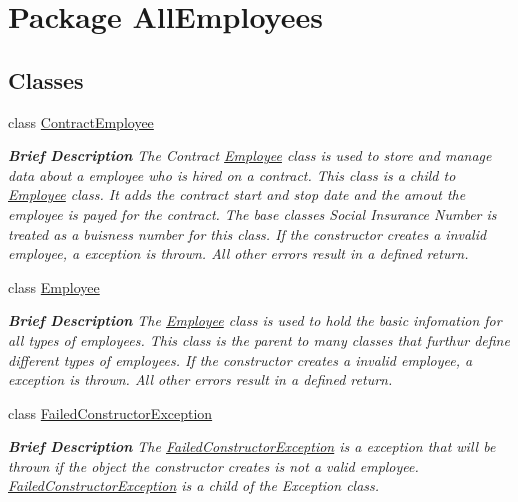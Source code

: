 \hypertarget{namespace_all_employees}{}\section{Package All\+Employees}
\label{namespace_all_employees}
\subsection*{Classes}
\begin{DoxyCompactItemize}
\item 
class \hyperlink{class_all_employees_1_1_contract_employee}{Contract\+Employee}
\begin{DoxyCompactList}\small\item\em {\bfseries Brief Description} The Contract \hyperlink{class_all_employees_1_1_employee}{Employee} class is used to store and manage data about a employee who is hired on a contract. This class is a child to \hyperlink{class_all_employees_1_1_employee}{Employee} class. It adds the contract start and stop date and the amout the employee is payed for the contract. The base classes Social Insurance Number is treated as a buisness number for this class. If the constructor creates a invalid employee, a exception is thrown. All other errors result in a defined return. \end{DoxyCompactList}\item 
class \hyperlink{class_all_employees_1_1_employee}{Employee}
\begin{DoxyCompactList}\small\item\em {\bfseries Brief Description} The \hyperlink{class_all_employees_1_1_employee}{Employee} class is used to hold the basic infomation for all types of employees. This class is the parent to many classes that furthur define different types of employees. If the constructor creates a invalid employee, a exception is thrown. All other errors result in a defined return. \end{DoxyCompactList}\item 
class \hyperlink{class_all_employees_1_1_failed_constructor_exception}{Failed\+Constructor\+Exception}
\begin{DoxyCompactList}\small\item\em {\bfseries Brief Description} The \hyperlink{class_all_employees_1_1_failed_constructor_exception}{Failed\+Constructor\+Exception} is a exception that will be thrown if the object the constructor creates is not a valid employee. \hyperlink{class_all_employees_1_1_failed_constructor_exception}{Failed\+Constructor\+Exception} is a child of the Exception class. \end{DoxyCompactList}\item 

\end{DoxyCompactItemize}
